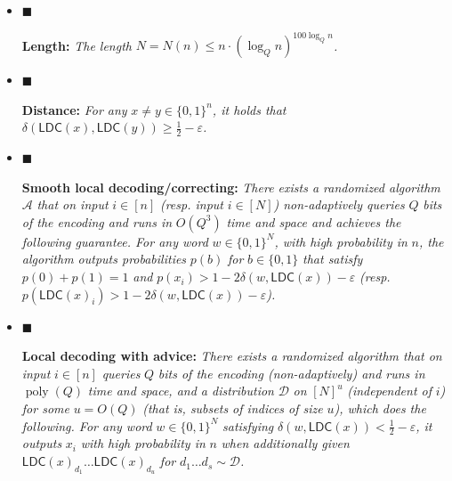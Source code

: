 \begin{itemize}


\item[] 
$\blacksquare$ 


\textbf{Length:}\emph{
The length }$N=N(n)\leq n\cdot(\log_{Q}n)^{100\log_{Q}n}$\emph{.}\par





\item[] 
$\blacksquare$ 


\textbf{Distance:}\emph{
For any }$x\not=y\in\{0,1\}^{n}$\emph{, it holds that }$\delta(\mathsf{LDC}(x),\mathsf{LDC}(y))\geq\frac{1}{2}-\varepsilon$\emph{.}\par





\item[] 
$\blacksquare$ 


\textbf{Smooth local decoding/correcting:}\emph{
There exists a randomized algorithm }$\mathcal{A}$\emph{ that on input }$i\in[n]$\emph{ (resp. input }$i\in[N]$\emph{) non-adaptively queries }$Q$\emph{ bits of the encoding and runs in }$O(Q^{3})$\emph{ time and space and achieves the following guarantee. For any word }$w\in\{0,1\}^{N}$\emph{, with high probability in }$n$\emph{, the algorithm outputs probabilities }$p(b)$\emph{ for }$b\in\{0,1\}$\emph{ that satisfy }$p(0)+p(1)=1$\emph{ and }$p(x_{i})>1-2\delta(w,\mathsf{LDC}(x))-\varepsilon$\emph{ (resp. }$p(\mathsf{LDC}(x)_{i})>1-2\delta(w,\mathsf{LDC}(x))-\varepsilon$\emph{).}\par





\item[] 
$\blacksquare$ 


\textbf{Local decoding with advice:}\emph{
There exists a randomized algorithm that on input }$i\in[n]$\emph{ queries }$Q$\emph{ bits of the encoding (non-adaptively) and runs in }$\operatorname{poly}(Q)$\emph{ time and space, and a distribution }$\mathcal{D}$\emph{ on }$[N]^{u}$\emph{ (independent of }$i$\emph{) for some }$u=O(Q)$\emph{ (that is, subsets of indices of size }$u$\emph{), which does the following. For any word }$w\in\{0,1\}^{N}$\emph{ satisfying }$\delta(w,\mathsf{LDC}(x))<\frac{1}{2}-\varepsilon$\emph{, it outputs }$x_{i}$\emph{ with high probability in }$n$\emph{ when additionally given }$\mathsf{LDC}(x)_{d_{1}}\ldots\mathsf{LDC}(x)_{d_{u}}$\emph{ for }$d_{1}\ldots d_{s}\sim\mathcal{D}$\emph{.}\par





\end{itemize}



